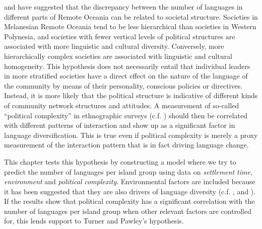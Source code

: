 \documentclass[a4paper,10pt]{article} %
\begin{document}
\citet{turner1884} and \citet{pawley81,pawley2007} have suggested that the discrepancy between the number of languages in different parts of Remote Oceania can be related to societal structure. Societies in Melanesian Remote Oceania tend to be less hierarchical than societies in Western Polynesia, and societies with fewer vertical levels of political structures are associated with more linguistic and cultural diversity. Conversely, more hierarchically complex societies are associated with linguistic and cultural homogeneity. This hypothesis does not necessarily entail that individual leaders in more stratified societies have a direct effect on the nature of the language of the community by means of their personality, conscious policies or directives. Instead, it is more likely that the political structure is indicative of different kinds of community network structures and attitudes. A measurement of so-called ``political complexity'' in ethnographic surveys (c.f. \citet{gray1998ethnographic}) should then be correlated with different patterns of interaction and show up as a significant factor in language diversification. This is true even if political complexity is merely a proxy measurement of the interaction pattern that is in fact driving language change. 

This chapter tests this hypothesis by constructing a model where we try to predict the number of languages per island group using data on \textit{settlement time}, \textit{environment} and \textit{political complexity}. Environmental factors are included because it has been suggested that they are also drivers of language diversity (c.f. \citet{NETTLE1998}, \citet{gavin2012island} and \citet{hua2019ecological}). If the results show that political complexity has a significant correlation with the number of languages per island group when other relevant factors are controlled for, this lends support to Turner and Pawley's hypothesis.
 
\end{document}
